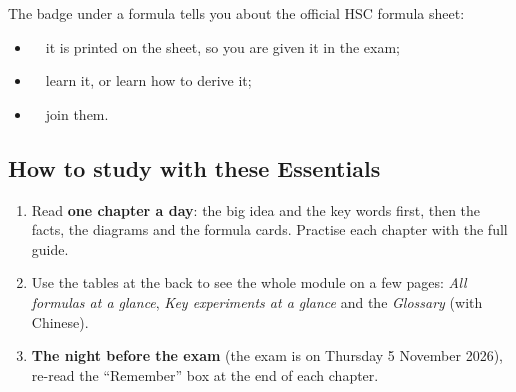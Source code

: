 \documentclass[11pt,a4paper,oneside,openany]{book}
\begin{document}
\smallskip
\noindent The badge under a formula tells you about the official HSC formula sheet:
\begin{itemize}
  \item \hscbadgeonsheet\ \ it is printed on the sheet, so you are given it in the exam;
  \item \hscbadgenotonsheet\ \ learn it, or learn how to derive it;
  \item {}\ \ join them.
\end{itemize}

\subsection*{How to study with these Essentials}

\begin{enumerate}
  \item Read \textbf{one chapter a day}: the big idea and the key words first, then the
        facts, the diagrams and the formula cards. Practise each chapter with the full guide.
  \item Use the tables at the back to see the whole module on a few pages: \emph{All
        formulas at a glance}, \emph{Key experiments at a glance} and the \emph{Glossary}
        (with Chinese).
  \item \textbf{The night before the exam} (the exam is on Thursday 5 November 2026),
        re-read the ``Remember'' box at the end of each chapter.
\end{enumerate}

{\setlength\parskip{0pt plus 1pt}\tableofcontents}


\end{document}
